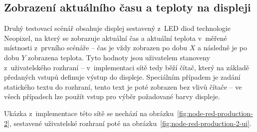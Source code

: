 \subsection{Zobrazení aktuálního času a teploty na displeji}\label{subsec:scenar-2}

Druhý testovací scénář obsahuje displej sestavený z~LED diod technologie Neopixel, na který se zobrazuje aktuální čas
a aktuální teplota v~měřené místnosti z~prvního scénáře -- čas je vždy zobrazen po dobu $X$ a následně je po dobu $Y$
zobrazena teplota.
Tyto hodnoty jsou uživatelem stanoveny z~uživatelského rozhraní -- v~implementaci sítě tedy běží čítač, který na
základě předaných vstupů definuje výstup do displeje.
Speciálním případem je zadání statického textu do rozhraní, tento text je poté zobrazen bez vlivů čítače -- ve všech
případech lze použít vstup pro výběr požadované barvy displeje.

Ukázka z~implementace této sítě se nechází na obrázku~\ref{fig:node-red-production-2}, sestavené uživatelské rozhraní
poté na obrázku~\ref{fig:node-red-production-2-ui}.

